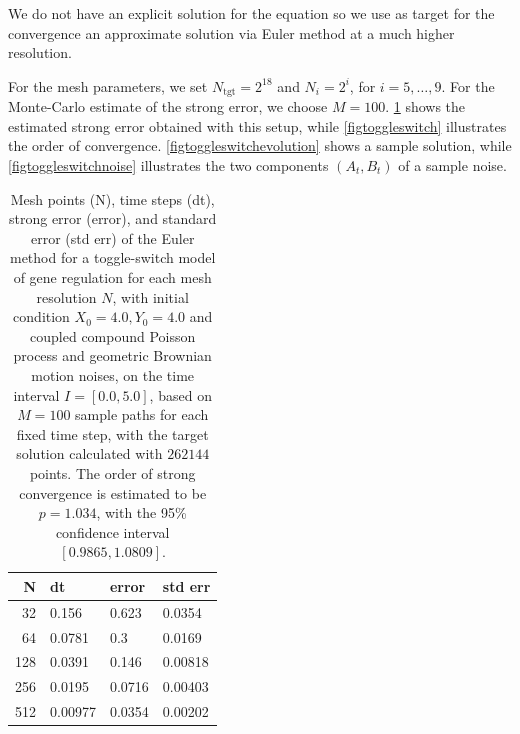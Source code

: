 \documentclass[reqno,12pt]{amsart}
\theoremstyle{plain} %
\theoremstyle{definition} %
\begin{document}
We do not have an explicit solution for the equation so we use as target for the convergence an approximate solution via Euler method at a much higher resolution.

For the mesh parameters, we set $N_{\textrm{tgt}} = 2^{18}$ and $N_i = 2^i$, for $i=5, \ldots, 9$. For the Monte-Carlo estimate of the strong error, we choose $M = 100.$ \cref{tabletoggleswitch} shows the estimated strong error obtained with this setup, while \cref{figtoggleswitch} illustrates the order of convergence. \cref{figtoggleswitchevolution} shows a sample solution, while \cref{figtoggleswitchnoise} illustrates the two components $(A_t, B_t)$ of a sample noise.

\begin{table}
    \begin{tabular}[htb]{|r|l|l|l|}
        \hline N & dt & error & std err \\
        \hline \hline
        32 & 0.156 & 0.623 & 0.0354 \\
        64 & 0.0781 & 0.3 & 0.0169 \\
        128 & 0.0391 & 0.146 & 0.00818 \\
        256 & 0.0195 & 0.0716 & 0.00403 \\
        512 & 0.00977 & 0.0354 & 0.00202 \\
        \hline
    \end{tabular}
    \bigskip

    \caption{Mesh points (N), time steps (dt), strong error (error), and standard error (std err) of the Euler method for a toggle-switch model of gene regulation for each mesh resolution $N$, with initial condition $X_0 = 4.0, Y_0 = 4.0$ and coupled compound Poisson process and geometric Brownian motion noises, on the time interval $I = [0.0, 5.0]$, based on $M = 100$ sample paths for each fixed time step, with the target solution calculated with $262144$ points. The order of strong convergence is estimated to be $p = 1.034$, with the 95\% confidence interval $[0.9865, 1.0809]$.}
    \label{tabletoggleswitch}
\end{table}
\end{document}
